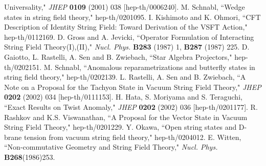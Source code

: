 \documentclass[a4paper,12pt]{article}
\begin{document}
\begin{thebibliography}{999}
 Universality," \textit{JHEP} \textbf{0109} (2001) 038 [hep-th/0006240].
M. Schnabl, ``Wedge states in string field theory," hep-th/0201095.
I. Kishimoto and K. Ohmori, ``CFT Description of Identity String Field: 
 Toward Derivation of the VSFT Action," hep-th/0112169. 
D. Gross and A. Jevicki, ``Operator Formulation of Interacting 
 String Field Theory(I),(II)," \textit{Nucl. Phys.} 
 \textbf{B283} (1987) 1, \textbf{B287} (1987) 225.
D. Gaiotto, L. Rastelli, A. Sen and B. Zwiebach, ``Star Algebra Projectors," hep-th/0202151. 
M. Schnabl, ``Anomalous reparametrizations and butterfly states in string field theory," 
 hep-th/0202139. 
L. Rastelli, A. Sen and B. Zwiebach, ``A Note on a Proposal for the Tachyon State in 
 Vacuum String Field Theory," \textit{JHEP} \textbf{0202} (2002) 034 [hep-th/0111153]. 
H. Hata, S. Moriyama and S. Teraguchi, ``Exact Results on Twist Anomaly," \textit{JHEP} 
 \textbf{0202} (2002) 036 [hep-th/0201177]. 
R. Rashkov and K.S. Viswanathan, ``A Proposal for the Vector State in Vacuum String 
 Field Theory," hep-th/0201229. 
Y. Okawa, ``Open string states and D-brane tension from vacuum string field theory," 
 hep-th/0204012.
E. Witten, ``Non-commutative Geometry and String Field Theory," 
 \textit{Nucl. Phys.} \textbf{B268}(1986)253.

\end{thebibliography}
\end{document}
